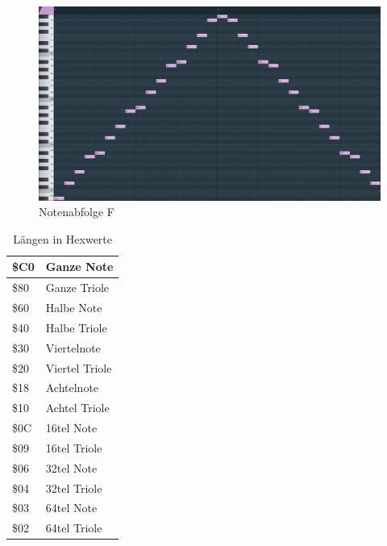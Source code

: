 \begin{figure}[htbp] \centering
	\includegraphics[width=.95\linewidth]{images/Noten_F.png}
	\caption{Notenabfolge F}
	\label{NotenabfolgeF}
\end{figure}


\begin{table}[htbp]
	\centering
	\begin{tabularx}{4.5cm}{|l|X|}
		\hline
		\$C0 & Ganze Note \\
		\hline
		\$80 & Ganze Triole \\
		\hline
		\$60 & Halbe Note \\
		\hline
		\$40 & Halbe Triole \\
		\hline
		\$30 & Viertelnote \\
		\hline
		\$20 & Viertel Triole \\
		\hline
		\$18 & Achtelnote \\
		\hline
		\$10 & Achtel Triole \\
		\hline
		\$0C & 16tel Note \\
		\hline
		\$09 & 16tel Triole \\
		\hline
		\$06 & 32tel Note \\
		\hline
		\$04 & 32tel Triole \\
		\hline
		\$03 & 64tel Note \\
		\hline
		\$02 & 64tel Triole \\
		\hline
	\end{tabularx}
	\caption{Längen in Hexwerte}
	\label{tickshex}
\end{table}

